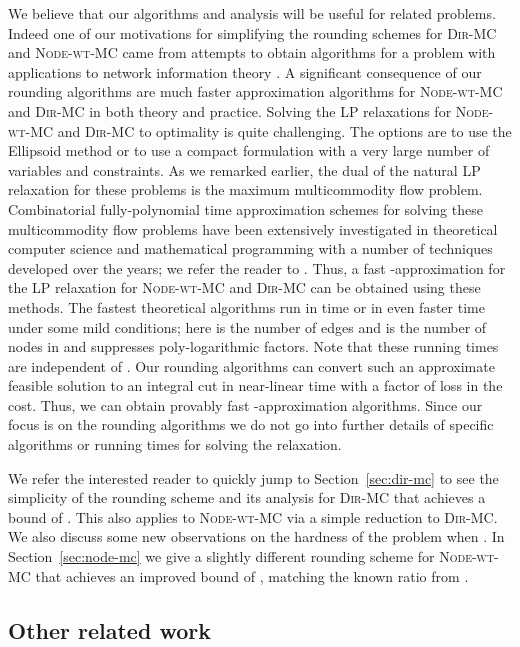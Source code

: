 \documentclass[11pt]{article}
\def\DirMC{\textsc{Dir-MC}\xspace}
\def\NodeMC{\textsc{Node-wt-MC}\xspace}
\def\NodeMC{\textsc{Node-wt-MC}\xspace}
\begin{document}
We believe that our algorithms and analysis will be useful for related
problems. Indeed one of our motivations for simplifying the rounding
schemes for \DirMC and \NodeMC came from attempts to obtain algorithms
for a problem with applications to network information theory
\cite{KKCV15}. A significant consequence of our rounding algorithms
are much faster approximation algorithms for \NodeMC and \DirMC in
both theory and practice. Solving the LP relaxations for \NodeMC and
\DirMC to optimality is quite challenging. The options are to use the
Ellipsoid method or to use a compact formulation with a very large
number of variables and constraints. As we remarked earlier, the dual
of the natural LP relaxation for these problems is the maximum
multicommodity flow problem. Combinatorial fully-polynomial time
approximation schemes for solving these multicommodity flow problems
have been extensively investigated in theoretical computer science and
mathematical programming with a number of techniques developed over
the years; we refer the reader to
\cite{PST95,GrigoriadisK94,Young95,Bienstock-book,GargK,Fleischer,BienstockI06,Madry10}. Thus,
a fast -approximation for the LP relaxation for \NodeMC and
\DirMC can be obtained using these methods. The fastest theoretical
algorithms run in time  \cite{Fleischer,GargK}
or in even faster  time \cite{Madry10} under
some mild conditions; here  is the number of edges and  is the
number of nodes in  and  suppresses poly-logarithmic
factors. Note that these running times are independent of .  Our
rounding algorithms can convert such an approximate feasible solution
to an integral cut in near-linear time with a factor of  loss in
the cost.  Thus, we can obtain provably fast -approximation
algorithms. Since our focus is on the rounding algorithms we do not go
into further details of specific algorithms or running times for
solving the relaxation.

We refer the interested reader to quickly jump to
Section~\ref{sec:dir-mc} to see the simplicity of the rounding scheme
and its analysis for \DirMC that achieves a bound of . This also
applies to \NodeMC via a simple reduction to \DirMC. We also discuss
some new observations on the hardness of the problem when . In
Section~\ref{sec:node-mc} we give a slightly different rounding scheme
for \NodeMC that achieves an improved bound of , matching
the known ratio from \cite{GargVY04}.

\subsection{Other related work}
\label{subsec:related-work}
\end{document}
